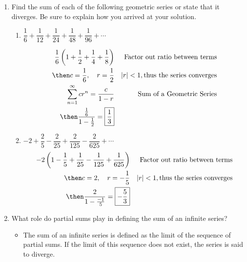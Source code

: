 \documentclass{nosvagor-notes}
\begin{document}
\begin{enumerate}
  \item Find the sum of each of the following geometric series or state that it
    diverges. Be sure to explain how you arrived at your solution.
    \begin{enumerate}
      \item \(\dfrac{1}{6} + \dfrac{1}{12} + \dfrac{1}{24} + \dfrac{1}{48} + \dfrac{1}{96} + \cdots\)

      \begin{align*}
        \frac{1}{6}\left(1+\frac{1}{2}+\frac{1}{4}+\frac{1}{8}\right)
        && \text{Factor out ratio between terms} \\
        \then c = \frac{1}{6}, \quad r = \frac{1}{2}
        && |r| < 1, \text{thus the series converges} \\
        \sum_{n=1}^{\infty} cr^n = \frac{c}{1-r}
        && \text{Sum of a Geometric Series} \\
        \then \frac{\frac{1}{6}}{1-\frac{1}{2}} = \boxed{\frac{1}{3}}
      \end{align*}
      \vspace{60pt}

      \item \(-2 + \dfrac{2}{5} - \dfrac{2}{25} + \dfrac{2}{125} - \dfrac{2}{625} + \cdots \)
      \begin{align*}
        -2\left(1-\frac{1}{5}+\frac{1}{25}-\frac{1}{125}+\frac{1}{625}\right)
        && \text{Factor out ratio between terms} \\
        \then c = 2, \quad r = -\frac{1}{5}
        && |r| < 1, \text{thus the series converges} \\
        \then \frac{2}{1-\frac{-1}{5}} = \boxed{-\frac{5}{3}}
      \end{align*}
    \end{enumerate}
  \newpage

  \item What role do partial sums play in defining the sum of an infinite
    series?

    \vspace{16pt}
    \begin{itemize}
      \item The sum of an infinite series is defined as the limit of the
        sequence of partial sums. If the limit of this sequence does not exist,
        the series is said to diverge.
    \end{itemize}

    \vspace{30pt}


\end{enumerate}
\end{document}
